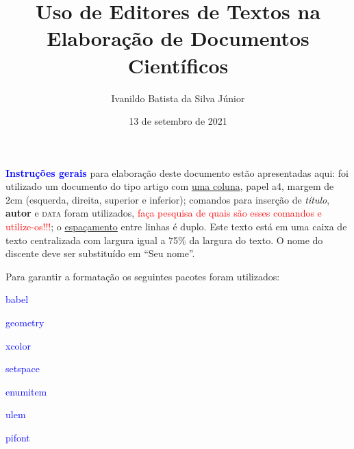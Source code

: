\documentclass[a4paper,notitlepage]{article}
\begin{document}
\title{Uso de Editores de Textos na Elaboração de Documentos Científicos}
\author{Ivanildo Batista da Silva Júnior}
\date{13 de setembro de 2021}

\maketitle

\doublespacing

\begin{center}
\begin{minipage}{0.75\linewidth}
\textbf{\textcolor{blue}{Instruções gerais}} para elaboração deste documento estão apresentadas aqui: foi utilizado um documento do tipo artigo com \underline{uma coluna}, papel a4, margem de 2cm (esquerda, direita, superior e inferior); comandos para inserção de \textit{título}, \textbf{autor} e \textsc{data} foram utilizados, \textcolor{red}{faça pesquisa de quais são esses comandos e utilize-os!!!}; o \underline{espaçamento} entre linhas é duplo. Este texto está em uma caixa de texto centralizada com largura igual a 75\% da largura do texto. O nome do discente deve ser substituído em “Seu nome”. \textcolor{red}{}
\end{minipage}
\end{center}

Para garantir a formatação os seguintes \colorbox{gray!80}{pacotes} foram utilizados:

\begin{enumerate*}[label =(\roman*)., itemjoin =\hfill]
\item \textcolor{blue}{babel} 
\item \textcolor{blue}{geometry} 
\item \textcolor{blue}{xcolor} 
\item \textcolor{blue}{setspace} 
\item \textcolor{blue}{enumitem} 
\item \textcolor{blue}{ulem} 
\item \textcolor{blue}{pifont}
\end{enumerate*}

%

\vspace{1cm}
\end{document}
